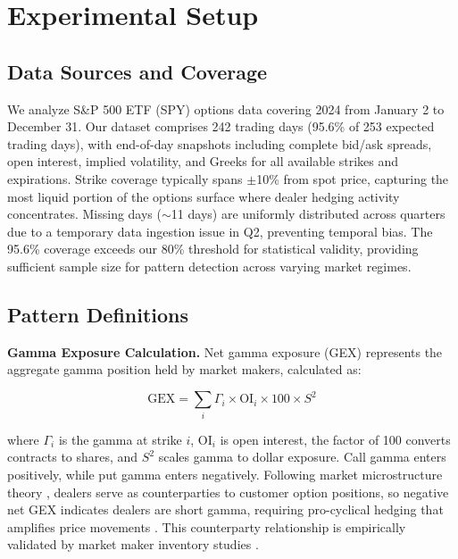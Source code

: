 \section{Experimental Setup}
\label{sec:experimental-jv}

\subsection{Data Sources and Coverage}

We analyze S\&P 500 ETF (SPY) options data covering 2024 from January 2 to December 31. Our dataset comprises 242 trading days (95.6\% of 253 expected trading days), with end-of-day snapshots including complete bid/ask spreads, open interest, implied volatility, and Greeks for all available strikes and expirations. Strike coverage typically spans $\pm$10\% from spot price, capturing the most liquid portion of the options surface where dealer hedging activity concentrates. Missing days ($\sim$11 days) are uniformly distributed across quarters due to a temporary data ingestion issue in Q2, preventing temporal bias. The 95.6\% coverage exceeds our 80\% threshold for statistical validity, providing sufficient sample size for pattern detection across varying market regimes.

\subsection{Pattern Definitions}

\textbf{Gamma Exposure Calculation.} Net gamma exposure (GEX) represents the aggregate gamma position held by market makers, calculated as:

\begin{equation}
\text{GEX} = \sum_{i} \Gamma_i \times \text{OI}_i \times 100 \times S^2
\end{equation}

where $\Gamma_i$ is the gamma at strike $i$, $\text{OI}_i$ is open interest, the factor of 100 converts contracts to shares, and $S^2$ scales gamma to dollar exposure. Call gamma enters positively, while put gamma enters negatively. Following market microstructure theory \citep{anderegg2022impact}, dealers serve as counterparties to customer option positions, so negative net GEX indicates dealers are short gamma, requiring pro-cyclical hedging that amplifies price movements \citep{spotgamma2019,spotgamma2021,nomura2017}. This counterparty relationship is empirically validated by market maker inventory studies \citep{dim2025zero}.

